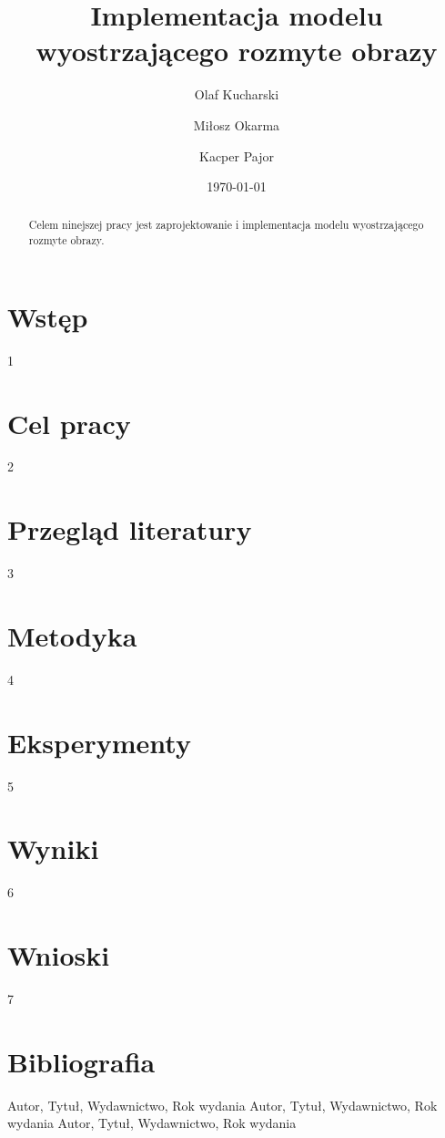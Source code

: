 \documentclass[a4paper,12pt]{article}
\title{Implementacja modelu wyostrzającego rozmyte obrazy}
\author{
Olaf Kucharski
\and
Miłosz Okarma
\and
Kacper Pajor
}
\date{\today}
\begin{document}
\maketitle
\begin{abstract}
Celem ninejszej pracy jest zaprojektowanie i implementacja modelu wyostrzającego rozmyte obrazy.
\end{abstract}

\tableofcontents
\newpage

\section{Wstęp}

1

\section{Cel pracy}

2

\section{Przegląd literatury}

3

\section{Metodyka}

4

\section{Eksperymenty}

5

\section{Wyniki}

6

\section{Wnioski}

7

\section{Bibliografia}
\begin{thebibliography}{99}
	 Autor, Tytuł, Wydawnictwo, Rok wydania
	 Autor, Tytuł, Wydawnictwo, Rok wydania
	 Autor, Tytuł, Wydawnictwo, Rok wydania
\end{thebibliography}
\end{document}

